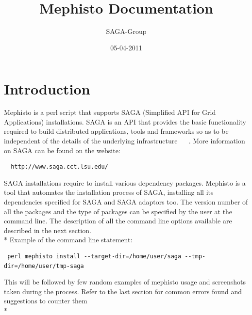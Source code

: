 \documentclass[a4paper,10pt]{article}
\newcommand{\jhanote}[1]{  {\textcolor{red}     { ***Shantenu: #1 }}}
\newcommand{\jhanote}[1]{}
\begin{document}
 \title{ \Large \vspace{-3.5em} Mephisto Documentation }
 
 \author{ SAGA-Group}
 \date{05-04-2011}
 \maketitle
 




\section*{Introduction}
Mephisto is a perl script that supports SAGA (Simplified API for Grid Applications) 
installations. SAGA is an API that provides the basic functionality required to build 
distributed applications, tools and frameworks so as to be independent of the details 
of the underlying infrastructure ~\cite{saga-home} ~\cite{saga-tools}. More information
on SAGA can be found on the website:
\begin{verbatim}
  http://www.saga.cct.lsu.edu/
\end{verbatim}
SAGA installations require to install various dependency packages. 
Mephisto is a tool that automates the installation process of SAGA, installing 
all its dependencies specified for SAGA and SAGA adaptors too.  
The version number of all the packages and the type of packages can 
be specified by the user at the command line. The description 
of all the command line options available are described 
in the next section.\\*
Example of the command line statement: 
\begin{verbatim} perl mephisto install --target-dir=/home/user/saga --tmp-dir=/home/user/tmp-saga \end{verbatim} 
This will be followed by few random examples of mephisto usage and screenshots taken during the
process. Refer to the last section for common errors found and suggestions to counter them\\*
\end{document}
